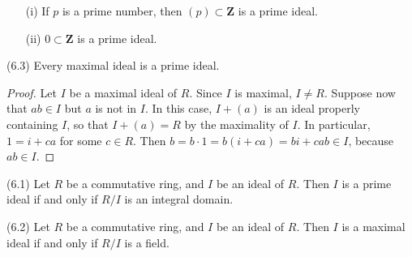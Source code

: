\vspace{2ex}
\begin{rmk}
\begin{itemize}
\item[(i)] If $p$ is a prime number, then $(p)\subset {\bm Z}$ is a prime ideal.
\item[(ii)] $0\subset {\bm Z}$ is a prime ideal.
\end{itemize}
\end{rmk}
\vspace{2ex}
\begin{prop}
(6.3) Every maximal ideal is a prime ideal.
\end{prop}
\vspace{2ex}
\begin{proof}
Let $I$ be a maximal ideal of $R$. Since $I$ is maximal, $I\ne R$. Suppose now that $ab\in I$ but $a$ is not in $I$. In this case, $I+(a)$ is an ideal properly containing $I$, so that $I+(a)=R$ by the maximality of $I$. In particular, $1=i+ca$ for some $c\in R$. Then $b=b\cdot 1=b(i+ca)=bi+cab\in I$, because $ab\in I$. 
\end{proof}
\vspace{2ex}
\begin{thm}
(6.1) Let $R$ be a commutative ring, and $I$ be an ideal of $R$. Then $I$ is a prime ideal if and only if $R/I$ is an integral domain.
\end{thm}
\vspace{2ex}
\begin{thm}
(6.2) Let $R$ be a commutative ring, and $I$ be an ideal of $R$. Then $I$ is a maximal ideal if and only if $R/I$ is a field.
\end{thm}
\vspace{2ex}


